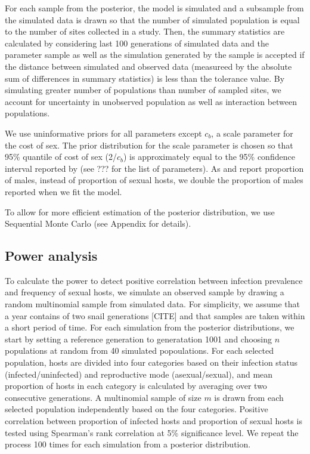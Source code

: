 \documentclass{article}\usepackage[]{graphicx}\usepackage[]{color}
\begin{document}
For each sample from the posterior, the model is simulated and a subsample from the simulated data is drawn so that the number of simulated population is equal to the number of sites collected in a study.
Then, the summary statistics are calculated by considering last 100 generations of simulated data and the parameter sample as well as the simulation generated by the sample is accepted if the distance between simulated and observed data (measureed by the absolute sum of differences in summary statistics) is less than the tolerance value.
By simulating greater number of populations than number of sampled sites, we account for uncertainty in unobserved population as well as interaction between populations.

We use uninformative priors for all parameters except $c_b$, a scale parameter for the cost of sex.
The prior distribution for the scale parameter is chosen so that 95\% quantile of cost of sex (2/$c_b$) is approximately equal to the 95\% confidence interval reported by \cite{gibson2017two} (see ??? for the list of parameters).
As \cite{dagan2013clonal} and \cite{mckone2016fine} report proportion of males, instead of proportion of sexual hosts, we double the proportion of males reported when we fit the model.

To allow for more efficient estimation of the posterior distribution, we use Sequential Monte Carlo \cite{turner2012tutorial} (see Appendix for details).

\subsection{Power analysis}

To calculate the power to detect positive correlation between infection prevalence and frequency of sexual hosts, we simulate an observed sample by drawing a random multinomial sample from simulated data.
For simplicity, we assume that a year contains of two snail generations [CITE] and that samples are taken within a short period of time.
For each simulation from the posterior distributions, we start by setting a reference generation to generatation 1001 and choosing $n$ populations at random from 40 simulated popoulations.
For each selected population, hosts are divided into four categories based on their infection status (infected/uninfected) and reproductive mode (asexual/sexual),
and mean proportion of hosts in each category is calculated by averaging over two consecutive generations.
A multinomial sample of size $m$ is drawn from each selected population independently based on the four categories. 
Positive correlation between proportion of infected hosts and proportion of sexual hosts is tested using Spearman's rank correlation at 5\% significance level.
We repeat the process 100 times for each simulation from a posterior distribution.
\end{document}
